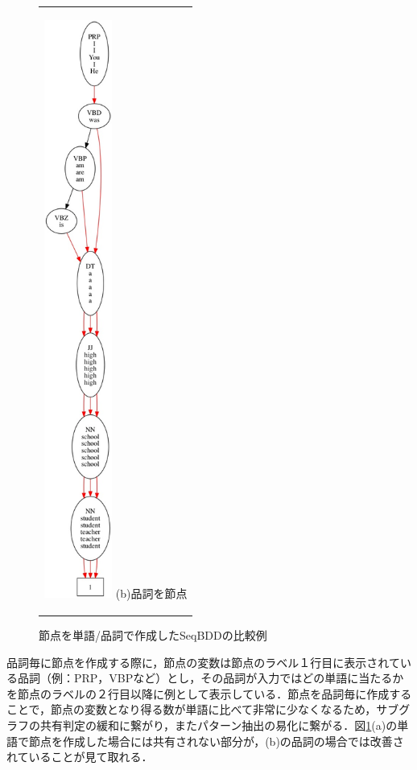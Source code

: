 \documentclass[12pt,twoside, fleqn]{ujbook}
\begin{document}
\begin{figure}[htbp]
\begin{center}
\begin{tabular}{c}
		\begin{minipage}{0.6\hsize}
			\begin{center}
			\includegraphics [clip, height=19cm]{./img/seq_parts.jpeg}
			\hspace{1.6cm} (b)品詞を節点
			\end{center}
		\end{minipage}
	\end{tabular}
	\caption{節点を単語/品詞で作成したSeqBDDの比較例}
	\label{fig:seqbdd_graph2}
	\end{center}
	\end{figure}

	\newpage
	品詞毎に節点を作成する際に，節点の変数は節点のラベル１行目に表示されている品詞（例：PRP，VBPなど）とし，その品詞が入力ではどの単語に当たるかを節点のラベルの２行目以降に例として表示している．節点を品詞毎に作成することで，節点の変数となり得る数が単語に比べて非常に少なくなるため，サブグラフの共有判定の緩和に繋がり，またパターン抽出の易化に繋がる．図\ref{fig:seqbdd_graph2}(a)の単語で節点を作成した場合には共有されない部分が，(b)の品詞の場合では改善されていることが見て取れる．
\end{document}
